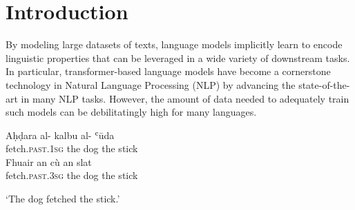\setcounter{section}{0}
\section{Introduction}
\label{sec:introduction}

	By modeling large datasets of texts, language models implicitly learn to encode linguistic properties that can be leveraged in a wide variety of downstream tasks. In particular, transformer-based language models have become a cornerstone technology in Natural Language Processing (NLP) by advancing the state-of-the-art in many NLP tasks. However, the amount of data needed to adequately train such models can be debilitatingly high for many languages.\cit

	\begin{exe}
		\ex
		\begin{xlist}
		\ex
		\gll Aḥḍara al- kalbu al- ʿūda\\
		     fetch.\textsc{past}.\textsc{1sg} the dog the stick\\
		\ex
		\gll Fhuair an cù an slat\\
		     fetch.\textsc{past}.\textsc{3sg} the dog the stick\\
		\end{xlist}
		\glt `The dog fetched the stick.'\\
	\end{exe}
